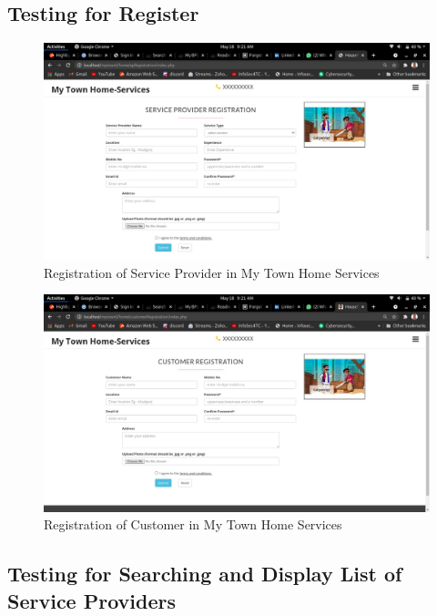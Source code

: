 \documentclass[12pt,a4paper]{report}
\begin{document}
\begin{titlepage}
{{\subsection{ Testing for Register }
\vspace{0.5cm}
\begin{figure}[h!]
	\begin{center}
		\includegraphics[width=1.0\linewidth,height=0.5\textheight]{sp.jpeg}
	\end{center}
	\caption{Registration of Service Provider in My Town Home Services}
\end{figure}

\textbf{ }
\textbf{ \hspace{15pt}}

\begin{figure}[h!]
	\begin{center}
		\includegraphics[width=\linewidth]{cust.jpeg}
	\end{center}
	\caption{Registration of Customer in My Town Home Services}
\end{figure}
\newpage
\raggedright
\subsection{ Testing for Searching and Display List of Service Providers }

}}
\end{titlepage}
\end{document}

